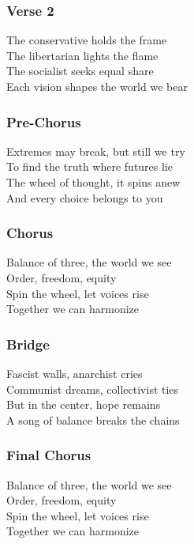 \documentclass[]{article}
\begin{document}
\subsubsection{Verse 2}\label{verse-2-24}

The conservative holds the frame\\
The libertarian lights the flame\\
The socialist seeks equal share\\
Each vision shapes the world we bear

\subsubsection{Pre-Chorus}\label{pre-chorus-54}

Extremes may break, but still we try\\
To find the truth where futures lie\\
The wheel of thought, it spins anew\\
And every choice belongs to you

\subsubsection{Chorus}\label{chorus-82}

Balance of three, the world we see\\
Order, freedom, equity\\
Spin the wheel, let voices rise\\
Together we can harmonize

\subsubsection{Bridge}\label{bridge-23}

Fascist walls, anarchist cries\\
Communist dreams, collectivist ties\\
But in the center, hope remains\\
A song of balance breaks the chains

\subsubsection{Final Chorus}\label{final-chorus-5}

Balance of three, the world we see\\
Order, freedom, equity\\
Spin the wheel, let voices rise\\
Together we can harmonize
\end{document}
